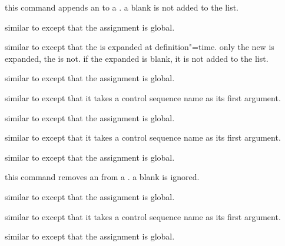 \begin{ltxsyntax}


this command appends an  to a . a blank  is not added to the list.


similar to  except that the assignment is global.


similar to  except that the  is expanded at definition"=time. only the new  is expanded, the  is not. if the expanded  is blank, it is not added to the list.


similar to  except that the assignment is global.


similar to  except that it takes a control sequence name as its first argument.


similar to  except that the assignment is global.


similar to  except that it takes a control sequence name as its first argument.


similar to  except that the assignment is global.


this command removes an  from a . a blank  is ignored.


similar to  except that the assignment is global.


similar to  except that it takes a control sequence name as its first argument.


similar to  except that the assignment is global.


\end{ltxsyntax}

